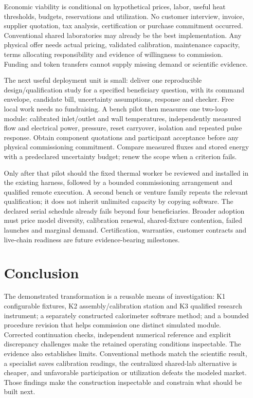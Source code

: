 \documentclass[11pt,letterpaper]{article}
\begin{document}
Economic viability is conditional on hypothetical prices, labor, useful heat thresholds, budgets, reservations and utilization. No customer interview, invoice, supplier quotation, tax analysis, certification or purchase commitment occurred. Conventional shared laboratories may already be the best implementation. Any physical offer needs actual pricing, validated calibration, maintenance capacity, terms allocating responsibility and evidence of willingness to commission. Funding and token transfers cannot supply missing demand or scientific evidence.

The next useful deployment unit is small: deliver one reproducible design/qualification study for a specified beneficiary question, with its command envelope, candidate bill, uncertainty assumptions, response and checker. Free local work needs no fundraising. A bench pilot then measures one two-loop module: calibrated inlet/outlet and wall temperatures, independently measured flow and electrical power, pressure, reset carryover, isolation and repeated pulse response. Obtain component quotations and participant acceptance before any physical commissioning commitment. Compare measured fluxes and stored energy with a predeclared uncertainty budget; renew the scope when a criterion fails.

Only after that pilot should the fixed thermal worker be reviewed and installed in the existing harness, followed by a bounded commissioning arrangement and qualified remote execution. A second bench or venture family repeats the relevant qualification; it does not inherit unlimited capacity by copying software. The declared serial schedule already fails beyond four beneficiaries. Broader adoption must price model diversity, calibration renewal, shared-fixture contention, failed launches and marginal demand. Certification, warranties, customer contracts and live-chain readiness are future evidence-bearing milestones.

\section{Conclusion}
The demonstrated transformation is a reusable means of investigation: K1 configurable fixtures, K2 assembly/calibration station and K3 qualified research instrument; a separately constructed calorimeter software method; and a bounded procedure revision that helps commission one distinct simulated module. Corrected continuation checks, independent numerical reference and explicit discrepancy challenges make the retained operating conditions inspectable. The evidence also establishes limits. Conventional methods match the scientific result, a specialist saves calibration readings, the centralized shared-lab alternative is cheaper, and unfavorable participation or utilization defeats the modeled market. Those findings make the construction inspectable and constrain what should be built next.
\end{document}
